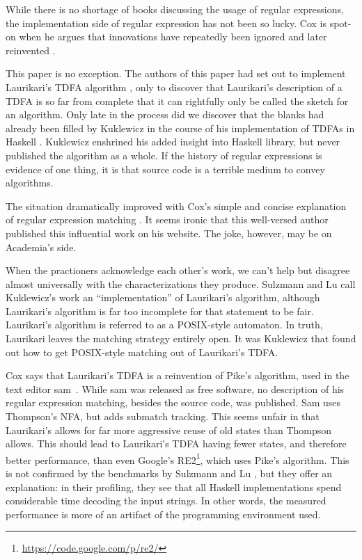 \documentclass[english]{sigplanconf}
\theoremstyle{definition}
\begin{document}
While there is no shortage of books discussing the usage of regular
expressions, the implementation side of regular expression has not
been so lucky. Cox is spot-on when he argues that innovations have
repeatedly been ignored and later reinvented \cite{Cox07a,Cox09a,Cox10a}. 

This paper is no exception. The authors of this paper had set out
to implement Laurikari's TDFA algorithm \cite{Laur00a},
only to discover that Laurikari's description of a TDFA is so far
from complete that it can rightfully only be called the sketch for
an algorithm. Only late in the process did we discover that the blanks
had already been filled by Kuklewicz in the course of his implementation
of TDFAs in Haskell \cite{Kukl07a}. Kuklewicz enshrined his
added insight into Haskell library, but never published the algorithm
as a whole. If the history of regular expressions is evidence of one
thing, it is that source code is a terrible medium to convey algorithms. 

The situation dramatically improved with Cox's simple and concise
explanation of regular expression matching \cite{Cox07a}. It seems
ironic that this well-versed author published this influential work
on his website. The joke, however, may be on Academia's side.

When the practioners acknowledge each other's work, we can't
help but disagree almost universally with the characterizations they
produce. Sulzmann and Lu \cite{Sulz12a} call Kuklewicz's
work an ``implementation'' of Laurikari's algorithm, although Laurikari's
algorithm is far too incomplete for that statement to be fair. Laurikari's
algorithm is referred to as a POSIX-style automaton. In truth, Laurikari
leaves the matching strategy entirely open. It was Kuklewicz that
found out how to get POSIX-style matching out of Laurikari's TDFA. 

Cox says that Laurikari's TDFA is a reinvention of Pike's algorithm,
used in the text editor sam~\cite{Pike87a}.  While sam was released
as free software, no description of his regular expression matching,
besides the source code, was published.  Sam uses Thompson's NFA,
but adds submatch tracking. This seems unfair in that Laurikari's
allows for far more aggressive reuse of old states than Thompson
allows. This should lead to Laurikari's TDFA having fewer states,
and therefore better performance, than even Google's
RE2\footnote{\url{https://code.google.com/p/re2/}}, which uses
Pike's algorithm.  This is not confirmed by the benchmarks by
Sulzmann and Lu \cite{Sulz12a}, but they offer an explanation: in
their profiling, they see that all Haskell implementations spend
considerable time decoding the input strings. In other words, the
measured performance is more of an artifact of the programming
environment used.
\end{document}
